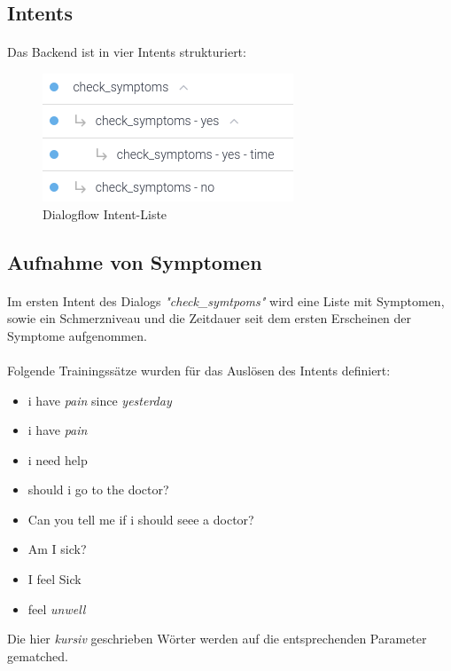 \documentclass[11pt,a4paper]{article}
\begin{document}
	\newpage


    \subsection{Intents}
        \paragraph{}
            Das Backend ist in vier Intents strukturiert:
            \begin{figure}[h!]
                \begin{center}
                    \includegraphics[width=0.4\linewidth]{intents.png}
                    \caption{Dialogflow Intent-Liste}
                    \label{fig:intentslist}
                \end{center}
            \end{figure}

    \subsection{Aufnahme von Symptomen}
        \paragraph{}
            Im ersten Intent des Dialogs \emph{"check\_symtpoms"} wird eine Liste mit Symptomen, sowie ein Schmerzniveau 
            und die Zeitdauer seit dem ersten Erscheinen der Symptome aufgenommen.

        \paragraph{}
            Folgende Trainingssätze wurden für das Auslösen des Intents definiert:
            \begin{itemize}
                \item i have \emph{pain} since \emph{yesterday}
                \item i have \emph{pain}
                \item i need help
                \item should i go to the doctor?
                \item Can you tell me if i should seee a doctor?
                \item Am I sick?
                \item I feel Sick
                \item feel \emph{unwell}
            \end{itemize}
            Die hier \emph{kursiv} geschrieben Wörter werden auf die entsprechenden Parameter gematched.
\end{document}
